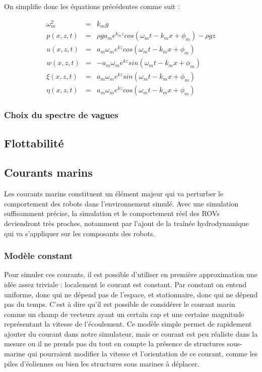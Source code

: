 				On simplifie donc les équations précédentes comme suit :
			
				\begin{eqnarray}
					\omega_m^2 & = & k_mg \\
					p(x, z, t) & = & \rho g a_m e^{k_mz}cos(\omega_mt - k_mx + \phi_m) - \rho g z\\
					u(x, z, t) & = & a_m \omega_m e^{kz}cos(\omega_mt -k_mx + \phi_m) \\
					w(x, z, t) & = & - a_m \omega_m e^{kz}sin(\omega_mt -k_mx + \phi_m) \\
					\xi(x, z, t) & = & a_m \omega_m e^{kz}sin(\omega_mt -k_mx + \phi_m) \\
					\eta(x, z, t) & = & a_m \omega_m e^{kz}cos(\omega_mt -k_mx + \phi_m)
				\end{eqnarray}

			\subsubsection{Choix du spectre de vagues}
				
				

		\subsection{Flottabilité}

		\subsection{Courants marins}

			Les courants marins constituent un élément majeur qui va perturber le comportement des robots dans l'environnement simulé. Avec une simulation suffisamment précise, la simulation et le comportement réel des \gls{ROV}s deviendront très proches, notamment par l'ajout de la traînée hydrodynamique qui va s'appliquer sur les composants des robots.

			\subsubsection{Modèle constant}

				Pour simuler ces courants, il est possible d'utiliser en première approximation une idée assez triviale : localement le courant est constant. Par constant on entend uniforme, donc qui ne dépend pas de l'espace, et stationnaire, donc qui ne dépend pas du temps. C'est à dire qu'il est possible de considérer le courant marin  comme un champ de vecteurs ayant un certain cap et une certaine magnitude représentant la vitesse de l'écoulement. Ce modèle simple permet de rapidement ajouter du courant dans notre simulateur, mais ce courant est peu réaliste dans la mesure ou il ne prends pas du tout en compte la présence de structures sous-marine qui pourraient modifier la vitesse et l'orientation de ce courant, comme les piles d'éoliennes ou bien les structures sous marines à déplacer.

